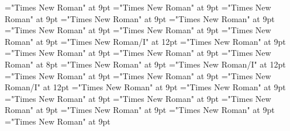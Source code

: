 \documentclass[gps1,twoside]{article}
\begin{document}
\font\spanspanpartofspeechmorphosyntaxanalysissensesensessubentrysubentriesentrybefore="Times New Roman" at 9pt
\font\spanpartofspeechmorphosyntaxanalysissensesensessubentrysubentriesentrylastchildafter="Times New Roman" at 9pt
\font\spanspanslotsmorphosyntaxanalysissensesensessubentrysubentriesentrybefore="Times New Roman" at 9pt
\font\slotsmorphosyntaxanalysissensesensessubentrysubentriesentrybefore="Times New Roman" at 9pt
\font\spanspannameslotslotsmorphosyntaxanalysissensesensessubentrysubentriesentrybefore="Times New Roman" at 9pt
\font\spannameslotslotsmorphosyntaxanalysissensesensessubentrysubentriesentrylastchildafter="Times New Roman" at 9pt
\font\sensetypesensesensessubentrysubentriesentrybefore="Times New Roman" at 9pt
\font\sensetypesensesensessubentrysubentriesentryafter="Times New Roman" at 9pt
\font\sensetypesensesensessubentrysubentriesentry="Times New Roman/I" at 12pt
\font\spanspanabbreviationsensetypesensesensessubentrysubentriesentrybefore="Times New Roman" at 9pt
\font\spanspandefinitionorglosssensesensessubentrysubentriesentrybefore="Times New Roman" at 9pt
\font\spandefinitionorglosssensesensessubentrysubentriesentrylastchildafter="Times New Roman" at 9pt
\font\exampleexampleexamplessensesensessubentrysubentriesentrybefore="Times New Roman" at 8pt
\font\examplessensesensessubentrysubentriesentryafter="Times New Roman" at 9pt
\font\spanbzhexampleexampleexamplessensesensessubentrysubentriesentry="Times New Roman/I" at 12pt
\font\spanspanexampleexampleexamplessensesensessubentrysubentriesentrybefore="Times New Roman" at 9pt
\font\spanexampleexampleexamplessensesensessubentrysubentriesentrylastchildafter="Times New Roman" at 9pt
\font\spanexampleexampleexamplessensesensessubentrysubentriesentry="Times New Roman/I" at 12pt
\font\spanspantranslationtranslationtranslationsexampleexamplessensesensessubentrysubentriesentrybefore="Times New Roman" at 9pt
\font\spantranslationtranslationtranslationsexampleexamplessensesensessubentrysubentriesentrylastchildafter="Times New Roman" at 9pt
\font\spanspanencyclopedicinfosensesensessubentrysubentriesentrybefore="Times New Roman" at 9pt
\font\spanencyclopedicinfosensesensessubentrysubentriesentryfirstchildbefore="Times New Roman" at 9pt
\font\spanencyclopedicinfosensesensessubentrysubentriesentrylastchildafter="Times New Roman" at 9pt
\font\spanspanrestrictionssensesensessubentrysubentriesentrybefore="Times New Roman" at 9pt
\font\spanrestrictionssensesensessubentrysubentriesentryfirstchildbefore="Times New Roman" at 9pt
\font\spanrestrictionssensesensessubentrysubentriesentrylastchildafter="Times New Roman" at 9pt
\end{document}
